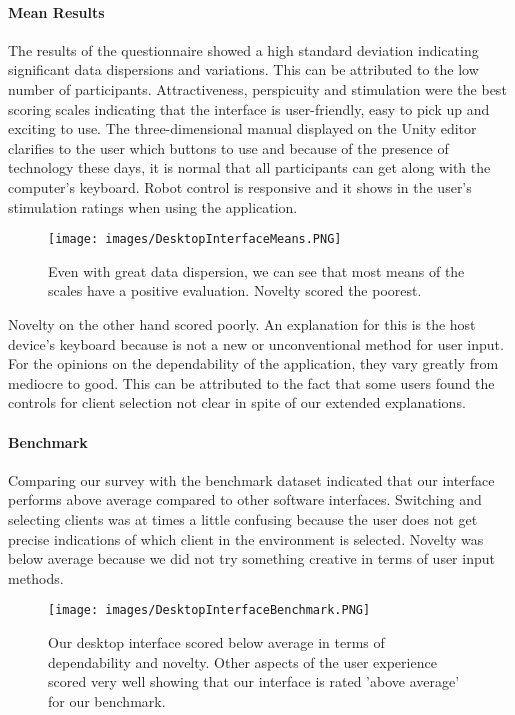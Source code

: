 \paragraph{Mean Results}
The results of the questionnaire showed a high standard deviation indicating significant data dispersions and variations. This can be attributed to the low number of participants. Attractiveness, perspicuity and stimulation were the best scoring scales indicating that the interface is user-friendly, easy to pick up and exciting to use. The three-dimensional manual displayed on the Unity editor clarifies to the user which buttons to use and because of the presence of technology these days, it is normal that all participants can get along with the computer's keyboard. Robot control is responsive and it shows in the user's stimulation ratings when using the application.
\newpage
\begin{figure}[!htb]
	\texttt{[image: images/DesktopInterfaceMeans.PNG]}
	\captionsetup{width=1.0\textwidth}
	\centering
	\caption{Even with great data dispersion, we can see that most means of the scales have a positive evaluation. Novelty scored the poorest. } 
\end{figure}

Novelty on the other hand scored poorly. An explanation for this is the host device's keyboard because is not a new or unconventional method for user input. For the opinions on the dependability of the application, they vary greatly from mediocre to good. This can be attributed to the fact that some users found the controls for client selection not clear in spite of our extended explanations.

\paragraph{Benchmark}
Comparing our survey with the benchmark dataset indicated that our interface performs above average compared to other software interfaces.
Switching and selecting clients was at times a little confusing because the user does not get precise indications of which client in the environment is selected. Novelty was below average because we did not try something creative in terms of user input methods.
\begin{figure}[!htb]
	\texttt{[image: images/DesktopInterfaceBenchmark.PNG]}
	\captionsetup{width=1.0\textwidth}
	\centering
	\caption{Our desktop interface scored below average in terms of dependability and novelty. Other aspects of the user experience scored very well showing that our interface is rated 'above average' for our benchmark. } 
\end{figure}

